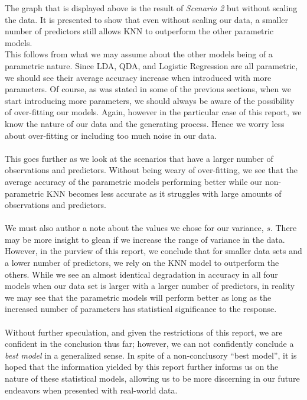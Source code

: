 \documentclass[11pt, oneside]{article}
\begin{document}
The graph that is displayed above is the result of \emph{Scenario 2} but without scaling the data. It is presented to show that even without scaling our data, a smaller number of predictors still allows KNN to outperform the other parametric models.\\

This follows from what we may assume about the other models being of a parametric nature. Since LDA, QDA, and Logistic Regression are all parametric, we should see their average accuracy increase when introduced with more parameters. Of course, as was stated in some of the previous sections, when we start introducing more parameters, we should always be aware of the possibility of over-fitting our models. Again, however in the particular case of this report, we know the nature of our data and the generating process. Hence we worry less about over-fitting or including too much noise in our data.\\
\\
This goes further as we look at the scenarios that have a larger number of observations and predictors. Without being weary of over-fitting, we see that the average accuracy of the parametric models performing better while our non-parametric KNN becomes less accurate as it struggles with large amounts of observations and predictors.\\
\\
We must also author a note about the values we chose for our variance, $s$. There may be more insight to glean if we increase the range of variance in the data. However, in the purview of this report, we conclude that for smaller data sets and a lower number of predictors, we rely on the KNN model to outperform the others. While we see an almost identical degradation in accuracy in all four models when our data set is larger with a larger number of predictors, in reality we may see that the parametric models will perform better as long as the increased number of parameters has statistical significance to the response.\\
\\
Without further speculation, and given the restrictions of this report, we are confident in the conclusion thus far; however, we can not confidently conclude a \emph{best model} in a generalized sense. In spite of a non-conclusory ``best model'', it is hoped that the information yielded by this report further informs us on the nature of these statistical models, allowing us to be more discerning in our future endeavors when presented with real-world data.  
\end{document}
